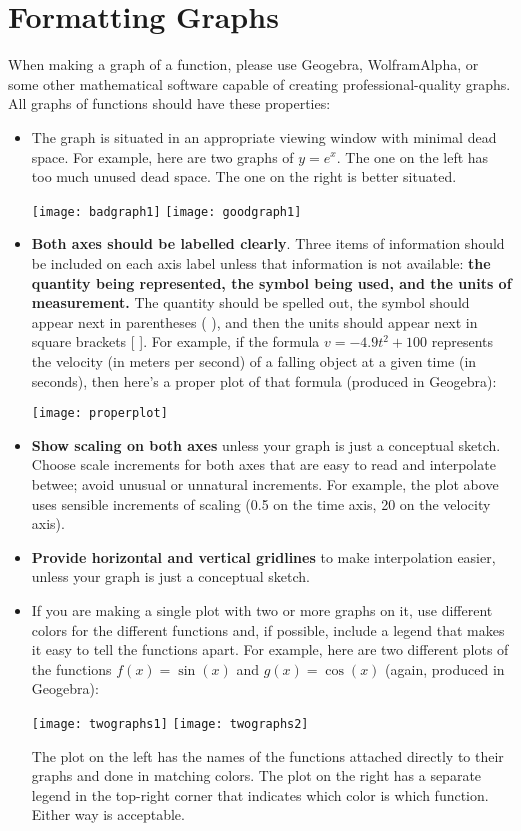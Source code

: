 \documentclass[11pt]{article}
\begin{document}
\section*{Formatting Graphs}
When making a graph of a function, please use Geogebra, Wolfram\textbar Alpha, or some other mathematical software capable of creating professional-quality graphs. All graphs of functions should have these properties: 
\begin{itemize}
	\item The graph is situated in an appropriate viewing window with minimal dead space. For example, here are two graphs of $y = e^x$. The one on the left has too much unused dead space. The one on the right is better situated. 
	\begin{center}
		\texttt{[image: badgraph1]}
		\qquad
		\texttt{[image: goodgraph1]}
	\end{center}
	
	\item \textbf{Both axes should be labelled clearly}. Three items of information should be included on each axis label unless that information is not available: \textbf{the quantity being represented, the symbol being used, and the units of measurement.} The quantity should be spelled out, the symbol should appear next in parentheses ( ), and then the units should appear next in square brackets [ ]. For example, if the formula $v = -4.9t^2 + 100$ represents the velocity (in meters per second) of a falling object at a given time (in seconds), then here's a proper plot of that formula (produced in Geogebra): 
	\begin{center}
		\texttt{[image: properplot]}
	\end{center}
	
	\item \textbf{Show scaling on both axes} unless your graph is just a conceptual sketch. Choose scale increments for both axes that are easy to read and interpolate betwee; avoid unusual or unnatural increments. For example, the plot above uses sensible increments of scaling (0.5 on the time axis, 20 on the velocity axis). 
	
	\item \textbf{Provide horizontal and vertical gridlines} to make interpolation easier, unless your graph is just a conceptual sketch. 
	
	\item If you are making a single plot with two or more graphs on it, use different colors for the different functions and, if possible, include a legend that makes it easy to tell the functions apart. For example, here are two different plots of the functions $f(x) = \sin(x)$ and $g(x) = \cos(x)$ (again, produced in Geogebra): 
	\begin{center}
		\texttt{[image: twographs1]}
		\qquad
		\texttt{[image: twographs2]}
	\end{center}
The plot on the left has the names of the functions attached directly to their graphs and done in matching colors. The plot on the right has a separate legend in the top-right corner that indicates which color is which function. Either way is acceptable. 
	

\end{itemize}
\end{document}
